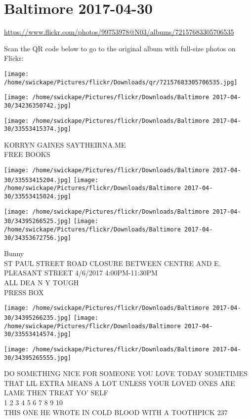 \documentclass[10pt,letterpaper]{article}
\title{}
\author{}
\date{}
\begin{document}
\section*{Baltimore 2017-04-30}

\url{https://www.flickr.com/photos/99753978@N03/albums/72157683305706535}

Scan the QR code below to go to the original album with full-size photos on Flickr:

\texttt{[image: /home/swickape/Pictures/flickr/Downloads/qr/72157683305706535.jpg]}
\pagebreak

\texttt{[image: /home/swickape/Pictures/flickr/Downloads/Baltimore 2017-04-30/34236350742.jpg]}

\vspace{0.25in}
\texttt{[image: /home/swickape/Pictures/flickr/Downloads/Baltimore 2017-04-30/33553415374.jpg]}

KORRYN GAINES SAYTHEIRNA.ME\\
FREE BOOKS
\pagebreak

\texttt{[image: /home/swickape/Pictures/flickr/Downloads/Baltimore 2017-04-30/33553415204.jpg]}
\texttt{[image: /home/swickape/Pictures/flickr/Downloads/Baltimore 2017-04-30/33553415024.jpg]}

\texttt{[image: /home/swickape/Pictures/flickr/Downloads/Baltimore 2017-04-30/34395266525.jpg]}
\texttt{[image: /home/swickape/Pictures/flickr/Downloads/Baltimore 2017-04-30/34353672756.jpg]}

Bunny\\
ST PAUL STREET ROAD CLOSURE BETWEEN CENTRE AND E. PLEASANT STREET 4/6/2017 4:00PM{-}11:30PM\\
ALL DEA N Y TOUGH\\
PRESS BOX
\pagebreak

\texttt{[image: /home/swickape/Pictures/flickr/Downloads/Baltimore 2017-04-30/34395266235.jpg]}
\texttt{[image: /home/swickape/Pictures/flickr/Downloads/Baltimore 2017-04-30/33553414574.jpg]}

\texttt{[image: /home/swickape/Pictures/flickr/Downloads/Baltimore 2017-04-30/34395265555.jpg]}

DO SOMETHING NICE FOR SOMEONE YOU LOVE TODAY SOMETIMES THAT LIL EXTRA MEANS A LOT UNLESS YOUR LOVED ONES ARE LAME THEN TREAT YO' SELF\\
1 2 3 4 5 6 7 8 9 10\\
THIS ONE HE WROTE IN COLD BLOOD WITH A TOOTHPICK 237
\pagebreak
\end{document}
